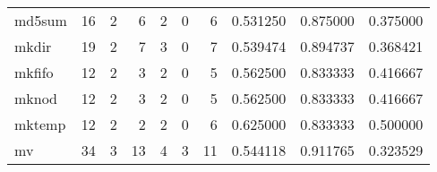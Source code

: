 \begin{longtable}{lrrrrrrrrr}
md5sum    &                                      16 &                                                  2 &                                                  6 &                                                  2 &                                                  0 &                                                  6 &                                           0.531250 &                               0.875000 &                             0.375000 \\
mkdir     &                                      19 &                                                  2 &                                                  7 &                                                  3 &                                                  0 &                                                  7 &                                           0.539474 &                               0.894737 &                             0.368421 \\
mkfifo    &                                      12 &                                                  2 &                                                  3 &                                                  2 &                                                  0 &                                                  5 &                                           0.562500 &                               0.833333 &                             0.416667 \\
mknod     &                                      12 &                                                  2 &                                                  3 &                                                  2 &                                                  0 &                                                  5 &                                           0.562500 &                               0.833333 &                             0.416667 \\
mktemp    &                                      12 &                                                  2 &                                                  2 &                                                  2 &                                                  0 &                                                  6 &                                           0.625000 &                               0.833333 &                             0.500000 \\
mv        &                                      34 &                                                  3 &                                                 13 &                                                  4 &                                                  3 &                                                 11 &                                           0.544118 &                               0.911765 &                             0.323529 \\

\end{longtable}
